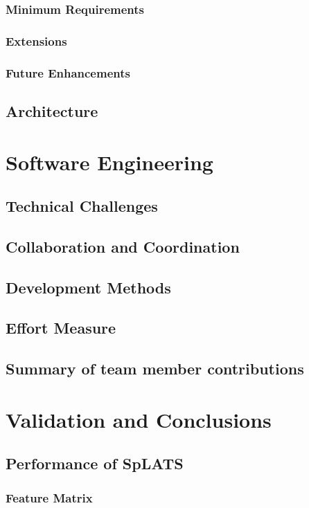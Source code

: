 \documentclass{report}
\begin{document}
\subsection{Minimum Requirements}
\subsection{Extensions}
\subsection{Future Enhancements}

\section{Architecture}


\chapter{Software Engineering}
\section{Technical Challenges}
\section{Collaboration and Coordination}
\section{Development Methods}
\section{Effort Measure}
\section{Summary of team member contributions}

\chapter{Validation and Conclusions}
\section{Performance of SpLATS}
\subsection{Feature Matrix}
\end{document}
